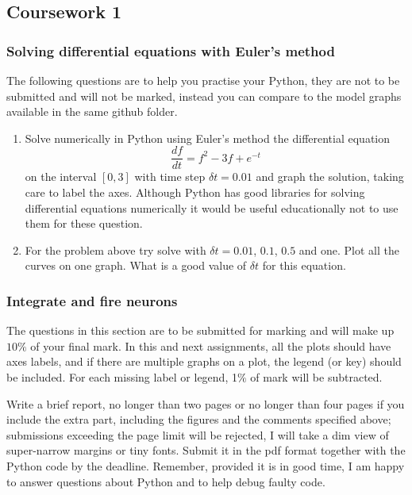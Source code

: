 \documentclass[11pt,a4paper]{scrartcl}
\begin{document}
\subsection*{Coursework 1}

\subsubsection*{Solving differential equations with Euler's method}

The following questions are to help you practise your Python, they are
not to be submitted and will not be marked, instead you can compare to
the model graphs available in the same github folder.

\begin{enumerate}

\item Solve numerically in Python using Euler's method the differential equation
\begin{equation}
\frac{df}{dt}=f^2-3f+e^{-t}
\end{equation}
on the interval $[0,3]$ with time step $\delta t=0.01$ and graph the
solution, taking care to label the axes. Although Python has good
libraries for solving differential equations numerically it would be
useful educationally not to use them for these question.

\item For the problem above try solve with $\delta t=0.01$, $0.1$,
  $0.5$ and one. Plot all the curves on one graph. What is a good
  value of $\delta t$ for this equation.

\end{enumerate}

\subsubsection*{Integrate and fire neurons}

The questions in this section are to be submitted for marking and will
make up $10\%$ of your final mark. In this and next assignments, all
the plots should have axes labels, and if there are multiple graphs on
a plot, the legend (or key) should be included. For each missing label
or legend, 1$\%$ of mark will be subtracted.

Write a brief report, no longer than two pages or no longer than four
pages if you include the extra part, including the figures and the
comments specified above; submissions exceeding the page limit will be
rejected, I will take a dim view of super-narrow margins or tiny
fonts. Submit it in the pdf format together with the Python code by
the deadline. Remember, provided it is in good time, I am happy to
answer questions about Python and to help debug faulty code.
\end{document}

